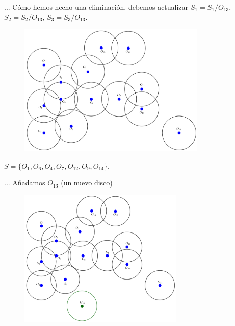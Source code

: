 \begin{frame}{...}
  Cómo hemos hecho una eliminación, debemos actualizar $S_1 = S_1/O_{13}$,
  $S_2 = S_2/O_{13}$, $S_3 = S_3/O_{13}$.
  \begin{figure}  
    \centering
    \includegraphics[width=0.8\textwidth]{./Images/04.png}
  \end{figure}
  $S = \{O_1, O_6, O_4, O_7, O_{12}, O_9, O_{14}\}$.
\end{frame}

\begin{frame}{...}
  Añadamos $O_{13}$ (un nuevo disco)
  \begin{figure}  
    \centering
    \includegraphics[width=0.7\textwidth]{./Images/05.png}
  \end{figure}

\end{frame}


